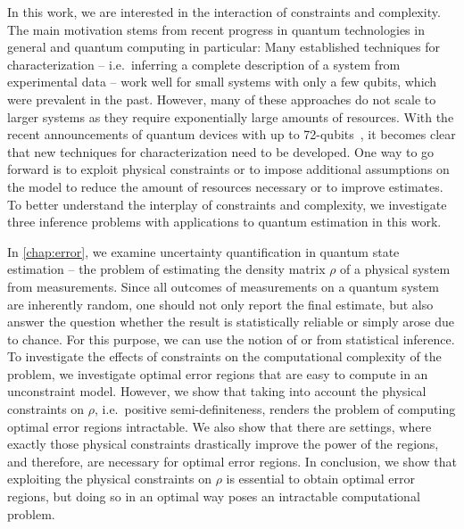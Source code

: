 In this work, we are interested in the interaction of constraints and complexity.
The main motivation stems from recent progress in quantum technologies in general and quantum computing in particular:
Many established techniques for characterization -- i.e.\ inferring a complete description of a system from experimental data -- work well for small systems with only a few qubits, which were prevalent in the past.
However, many of these approaches do not scale to larger systems as they require exponentially large amounts of resources.
With the recent announcements of quantum devices with up to 72-qubits~\cite{Sciencenews}, it becomes clear that new techniques for characterization need to be developed.
One way to go forward is to exploit physical constraints or to impose additional assumptions on the model to reduce the amount of resources necessary or to improve estimates.
To better understand the interplay of constraints and complexity, we investigate three inference problems with applications to quantum estimation in this work.

In \cref{chap:error}, we examine uncertainty quantification in quantum state estimation -- the problem of estimating the density matrix $\rho$ of a physical system from measurements.
Since all outcomes of measurements on a quantum system are inherently random, one should not only report the final estimate, but also answer the question whether the result is statistically reliable or simply arose due to chance.
For this purpose, we can use the notion of  or  from statistical inference.
To investigate the effects of constraints on the computational complexity of the problem, we investigate optimal error regions that are easy to compute in an unconstraint model.
However, we show that taking into account the physical constraints on $\rho$, i.e.\ positive semi-definiteness, renders the problem of computing optimal error regions intractable.
We also show that there are settings, where exactly those physical constraints drastically improve the power of the regions, and therefore, are necessary for optimal error regions.
In conclusion, we show that exploiting the physical constraints on $\rho$ is essential to obtain optimal error regions, but doing so in an optimal way poses an intractable computational problem.

